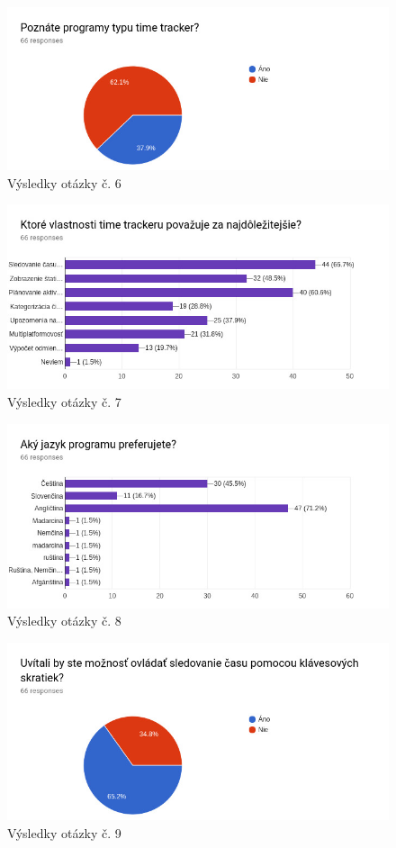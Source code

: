 \documentclass[]{article}
\begin{document}
\begin{figure}[h!]
	\includegraphics[width=\textwidth]{otazka6}
	\caption{Výsledky otázky č. 6}
\end{figure}

\begin{figure}[h!]
	\includegraphics[width=\textwidth]{otazka7}
	\caption{Výsledky otázky č. 7}
\end{figure}

\begin{figure}[h!]
	\includegraphics[width=\textwidth]{otazka8}
	\caption{Výsledky otázky č. 8}
\end{figure}

\begin{figure}[h!]
	\includegraphics[width=\textwidth]{otazka9}
	\caption{Výsledky otázky č. 9}
\end{figure}
\end{document}
